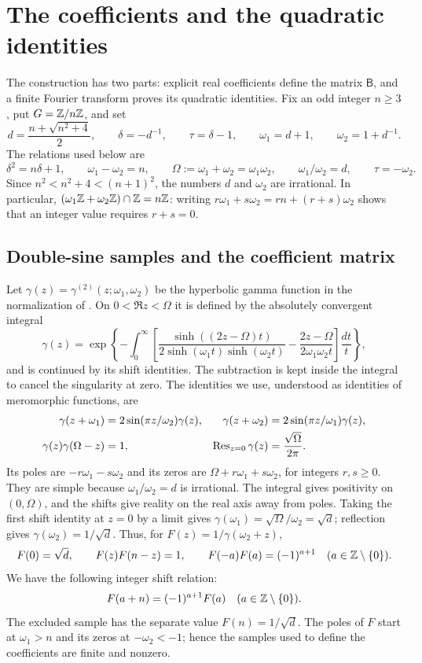 \section{The coefficients and the quadratic identities}

The construction has two parts: explicit real coefficients define the
matrix $\mathsf B$, and a finite Fourier transform proves its quadratic
identities.
Fix an odd integer $n\geq3$, put $G=\mathbb Z/n\mathbb Z$, and set
\[
 d=\frac{n+\sqrt{n^2+4}}2,\qquad \delta=-d^{-1},\qquad
 \tau=\delta-1,\qquad
 \omega_1=d+1,\qquad \omega_2=1+d^{-1}.
\]
The relations used below are
\[
 \delta^2=n\delta+1,\qquad \omega_1-\omega_2=n,\qquad
 \Omega:=\omega_1+\omega_2=\omega_1\omega_2,\qquad
 \omega_1/\omega_2=d,\qquad \tau=-\omega_2.
\]
Since $n^2<n^2+4<(n+1)^2$, the numbers $d$ and $\omega_2$ are
irrational. In particular,
$(\omega_1\mathbb Z+\omega_2\mathbb Z)\cap\mathbb Z=n\mathbb Z$: writing
$r\omega_1+s\omega_2=rn+(r+s)\omega_2$ shows that an integer value
requires $r+s=0$.

\subsection{Double-sine samples and the coefficient matrix}\label{coeff}

Let $\gamma(z)=\gamma^{(2)}(z;\omega_1,\omega_2)$ be the hyperbolic
gamma function in the normalization of \cite{BSS}. On
$0<\Re z<\Omega$ it is defined by the absolutely convergent integral
\[
 \gamma(z)=\exp\left\{-\int_0^\infty
 \left[\frac{\sinh((2z-\Omega)t)}
 {2\sinh(\omega_1t)\sinh(\omega_2t)}
 -\frac{2z-\Omega}{2\omega_1\omega_2t}\right]\frac{dt}{t}\right\},
\]
and is continued by its shift identities. The subtraction is kept
inside the integral to cancel the singularity at zero. The identities
we use, understood as identities of meromorphic functions, are
\begin{align}
 \gamma(z+\omega_1)&=2\sin(\pi z/\omega_2)\gamma(z),&
 \gamma(z+\omega_2)&=2\sin(\pi z/\omega_1)\gamma(z),
 \label{foundation:shifts}\\
 \gamma(z)\gamma(\Omega-z)&=1,&
 \operatorname{Res}_{z=0}\gamma(z)&=\frac{\sqrt\Omega}{2\pi}.
 \label{foundation:reflection}
\end{align}
Its poles are $-r\omega_1-s\omega_2$ and its zeros are
$\Omega+r\omega_1+s\omega_2$, for integers $r,s\geq0$.
They are simple because $\omega_1/\omega_2=d$ is irrational.
The integral gives positivity on $(0,\Omega)$, and the shifts give
reality on the real axis away from poles. Taking the first shift
identity at $z=0$ by a limit gives
$\gamma(\omega_1)=\sqrt\Omega/\omega_2=\sqrt d$; reflection gives
$\gamma(\omega_2)=1/\sqrt d$. Thus, for
$F(z)=1/\gamma(\omega_2+z)$,
\[
 F(0)=\sqrt d,\qquad F(z)F(n-z)=1,\qquad
 F(-a)F(a)=(-1)^{a+1}\quad(a\in\mathbb Z\setminus\{0\}).
\]
We have the following integer shift relation:
\begin{equation}\label{foundation:shift}
  F(a+n) = (-1)^{a+1}F(a)\quad(a\in\mathbb Z\setminus\{0\}).
\end{equation}
The excluded sample has the separate value $F(n)=1/\sqrt d$.
The poles of $F$ start at $\omega_1>n$ and its zeros at
$-\omega_2<-1$; hence the samples used to define the coefficients
are finite and nonzero.

